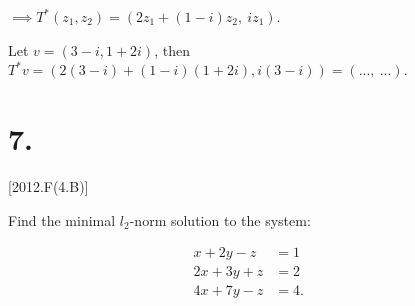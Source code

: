 \documentclass{article}
\begin{document}
  $\implies T^*(z_1, z_2) = (2z_1 + (1-i)z_2,\: iz_1)$.

  Let $v = (3-i, 1+2i)$, then 
  $T^*v 
  = (2(3-i) + (1-i)(1+2i), i(3-i))
  = (...,\: ...)$.
  
  \newpage


  \section*{7.}[2012.F(4.B)]

  Find the minimal $l_2$-norm solution to the system:

  \begin{align*}
    x + 2y  - z &= 1 &&\\
    2x + 3y + z &= 2 &&\\
    4x + 7y - z &= 4.
  \end{align*}
\end{document}
